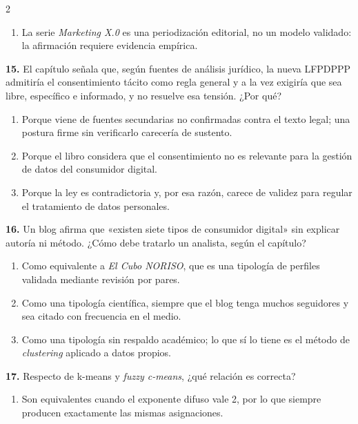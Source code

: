 \documentclass[10pt,letterpaper]{article}
\begin{document}
\begin{multicols}{2}
\begin{enumerate}[label=\alph*),leftmargin=1.1em,itemsep=0pt,topsep=1pt,parsep=0pt,partopsep=0pt]
\item La serie \textit{Marketing X.0} es una periodización editorial, no un modelo validado: la afirmación requiere evidencia empírica.
\end{enumerate}
\vspace{2pt}
\noindent\textbf{15.} El capítulo señala que, según fuentes de análisis jurídico, la nueva LFPDPPP admitiría el consentimiento tácito como regla general y a la vez exigiría que sea libre, específico e informado, y no resuelve esa tensión. ¿Por qué?
\vspace{-3pt}
\begin{enumerate}[label=\alph*),leftmargin=1.1em,itemsep=0pt,topsep=1pt,parsep=0pt,partopsep=0pt]
\item Porque viene de fuentes secundarias no confirmadas contra el texto legal; una postura firme sin verificarlo carecería de sustento.
\item Porque el libro considera que el consentimiento no es relevante para la gestión de datos del consumidor digital.
\item Porque la ley es contradictoria y, por esa razón, carece de validez para regular el tratamiento de datos personales.
\end{enumerate}
\vspace{2pt}
\noindent\textbf{16.} Un blog afirma que «existen siete tipos de consumidor digital» sin explicar autoría ni método. ¿Cómo debe tratarlo un analista, según el capítulo?
\vspace{-3pt}
\begin{enumerate}[label=\alph*),leftmargin=1.1em,itemsep=0pt,topsep=1pt,parsep=0pt,partopsep=0pt]
\item Como equivalente a \textit{El Cubo NORISO}, que es una tipología de perfiles validada mediante revisión por pares.
\item Como una tipología científica, siempre que el blog tenga muchos seguidores y sea citado con frecuencia en el medio.
\item Como una tipología sin respaldo académico; lo que sí lo tiene es el método de \textit{clustering} aplicado a datos propios.
\end{enumerate}
\vspace{2pt}
\noindent\textbf{17.} Respecto de k-means y \textit{fuzzy c-means}, ¿qué relación es correcta?
\vspace{-3pt}
\begin{enumerate}[label=\alph*),leftmargin=1.1em,itemsep=0pt,topsep=1pt,parsep=0pt,partopsep=0pt]
\item Son equivalentes cuando el exponente difuso vale 2, por lo que siempre producen exactamente las mismas asignaciones.

\end{enumerate}
\end{multicols}
\end{document}
